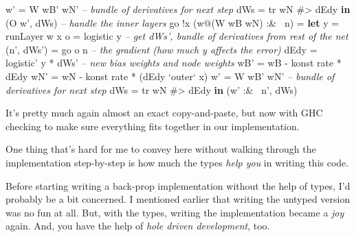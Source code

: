 \documentclass[]{article}
\newenvironment{Shaded}{}{}
\newcommand{\KeywordTok}[1]{\textcolor[rgb]{0.00,0.44,0.13}{\textbf{{#1}}}}
\newcommand{\DataTypeTok}[1]{\textcolor[rgb]{0.56,0.13,0.00}{{#1}}}
\newcommand{\CommentTok}[1]{\textcolor[rgb]{0.38,0.63,0.69}{\textit{{#1}}}}
\newcommand{\OtherTok}[1]{\textcolor[rgb]{0.00,0.44,0.13}{{#1}}}
\newcommand{\FunctionTok}[1]{\textcolor[rgb]{0.02,0.16,0.49}{{#1}}}
\newcommand{\NormalTok}[1]{{#1}}
\begin{document}
\begin{Shaded}
\begin{Highlighting}[]
              \NormalTok{w'   }\FunctionTok{=} \DataTypeTok{W} \NormalTok{wB' wN'}
              \CommentTok{-- bundle of derivatives for next step}
              \NormalTok{dWs  }\FunctionTok{=} \NormalTok{tr wN }\FunctionTok{#>} \NormalTok{dEdy}
          \KeywordTok{in}  \NormalTok{(}\DataTypeTok{O} \NormalTok{w', dWs)}
    \CommentTok{-- handle the inner layers}
    \NormalTok{go }\FunctionTok{!}\NormalTok{x (w}\FunctionTok{@}\NormalTok{(}\DataTypeTok{W} \NormalTok{wB wN) }\FunctionTok{:&~} \NormalTok{n)}
        \FunctionTok{=} \KeywordTok{let} \NormalTok{y          }\FunctionTok{=} \NormalTok{runLayer w x}
              \NormalTok{o          }\FunctionTok{=} \NormalTok{logistic y}
              \CommentTok{-- get dWs', bundle of derivatives from rest of the net}
              \NormalTok{(n', dWs') }\FunctionTok{=} \NormalTok{go o n}
              \CommentTok{-- the gradient (how much y affects the error)}
              \NormalTok{dEdy       }\FunctionTok{=} \NormalTok{logistic' y }\FunctionTok{*} \NormalTok{dWs'}
              \CommentTok{-- new bias weights and node weights}
              \NormalTok{wB'  }\FunctionTok{=} \NormalTok{wB }\FunctionTok{-} \NormalTok{konst rate }\FunctionTok{*} \NormalTok{dEdy}
              \NormalTok{wN'  }\FunctionTok{=} \NormalTok{wN }\FunctionTok{-} \NormalTok{konst rate }\FunctionTok{*} \NormalTok{(dEdy }\OtherTok{`outer`} \NormalTok{x)}
              \NormalTok{w'   }\FunctionTok{=} \DataTypeTok{W} \NormalTok{wB' wN'}
              \CommentTok{-- bundle of derivatives for next step}
              \NormalTok{dWs  }\FunctionTok{=} \NormalTok{tr wN }\FunctionTok{#>} \NormalTok{dEdy}
          \KeywordTok{in}  \NormalTok{(w' }\FunctionTok{:&~} \NormalTok{n', dWs)}
\end{Highlighting}
\end{Shaded}

It's pretty much again almost an exact copy-and-paste, but now with GHC checking
to make sure everything fits together in our implementation.

One thing that's hard for me to convey here without walking through the
implementation step-by-step is how much the types \emph{help you} in writing
this code.

Before starting writing a back-prop implementation without the help of types,
I'd probably be a bit concerned. I mentioned earlier that writing the untyped
version was no fun at all. But, with the types, writing the implementation
became a \emph{joy} again. And, you have the help of \emph{hole driven
development}, too.
\end{document}
